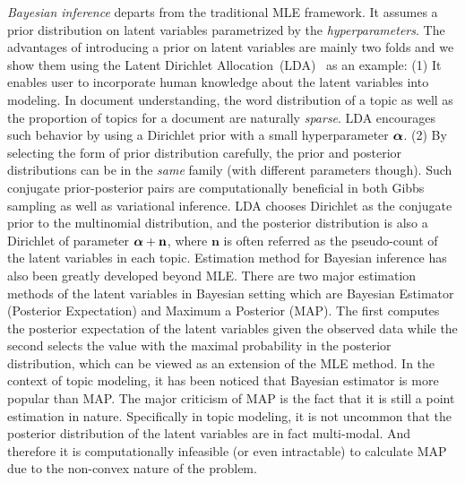 \emph{Bayesian inference} departs from the traditional MLE framework. It assumes
a prior distribution on latent variables parametrized by the
\emph{hyperparameters}. The advantages of introducing a prior on latent
variables are mainly two folds and we show them using the Latent Dirichlet
Allocation~(LDA)~\cite{blei2003latent} as an example: (1) It enables user to
incorporate human knowledge about the latent variables into modeling. In
document understanding, the word distribution of a topic as well as the
proportion of topics for a document are naturally \emph{sparse}. LDA encourages
such behavior by using a Dirichlet prior with a small hyperparameter $\boldsymbol{\alpha}$.
(2) By selecting the form of prior distribution carefully, the prior and
posterior distributions can be in the \emph{same} family (with different
parameters though). Such conjugate prior-posterior pairs are computationally
beneficial in both Gibbs sampling as well as variational inference. LDA chooses
Dirichlet as the conjugate prior to the multinomial distribution, and the
posterior distribution is also a Dirichlet of parameter $\boldsymbol{\alpha} + \mathbf{n}$,
where $\mathbf{n}$ is often referred as the pseudo-count of the latent variables
in each topic. Estimation method for Bayesian inference has also been greatly
developed beyond MLE. There are two major estimation methods of the latent
variables in Bayesian setting which are Bayesian Estimator (Posterior
Expectation) and Maximum a Posterior (MAP). The first computes the posterior
expectation of the latent variables given the observed data while the second
selects the value with the maximal probability in the posterior distribution,
which can be viewed as an extension of the MLE method. In the context of topic
modeling, it has been noticed that Bayesian estimator is more popular than MAP.
The major criticism of MAP is the fact that it is still a point estimation in
nature. Specifically in topic modeling, it is not uncommon that the posterior
distribution of the latent variables are in fact multi-modal. And therefore it
is computationally infeasible (or even intractable) to calculate MAP due to the
non-convex nature of the problem.


